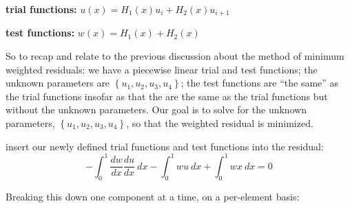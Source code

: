 \vspace{0.25cm}

\noindent\textbf{trial functions:} $u(x) = H_1(x)u_i + H_2(x)u_{i+1}$

\vspace{0.25cm}

\noindent\textbf{test functions:} $w(x) = H_1(x) + H_2(x)$

\vspace{0.25cm}

\noindent So to recap and relate to the previous discussion about the method of minimum weighted residuals: we have a piecewise linear trial and test functions; the unknown parameters are $\left\{u_1,u_2,u_3,u_4\right\}$; the test functions are ``the same'' as the trial functions insofar as that the are the same as the trial functions but without the unknown parameters.  Our goal is to solve for the unknown parameters, $\left\{u_1,u_2,u_3,u_4\right\}$, so that the weighted residual is minimized.

 insert our newly defined trial functions and test functions into the residual:
\begin{equation*}
-\int_{0}^{1}\frac{dw}{dx}\frac{du}{dx} \ dx - \int_{0}^{1} w u \ dx + \int_{0}^{1} wx \ dx = 0 
\end{equation*}

Breaking this down one component at a time, on a per-element basis:

